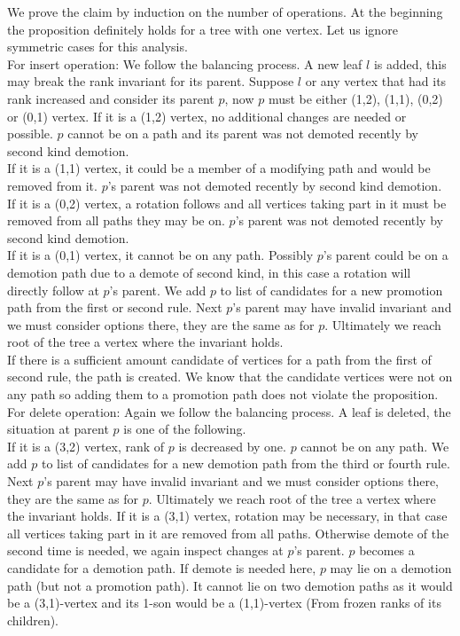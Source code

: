 \begin{myproof}
We prove the claim by induction on the number of operations. At the beginning the proposition definitely holds for a tree with one vertex. 
Let us ignore symmetric cases for this analysis.\\
For insert operation: We follow the balancing process. A new leaf $l$ is added, this may break the rank invariant for its parent. Suppose $l$ or any vertex that had its rank increased and consider its parent $p$, now $p$ must be either (1,2), (1,1), (0,2) or (0,1) vertex. 
If it is a (1,2) vertex, no additional changes are needed or possible. $p$ cannot be on a path and its parent was not demoted recently by second kind demotion.\\
If it is a (1,1) vertex, it could be a member of a modifying path and would be removed from it. $p$'s parent was not demoted recently by second kind demotion.\\
If it is a (0,2) vertex, a rotation follows and all vertices taking part in it must be removed from all paths they may be on. $p$'s parent was not demoted recently by second kind demotion.\\
If it is a (0,1) vertex, it cannot be on any path. Possibly $p$'s parent could be on a demotion path due to a demote of second kind, in this case a rotation will directly follow at $p$'s parent. We add $p$ to list of candidates for a new promotion path from the first or second rule. Next $p$'s parent may have invalid invariant and we must consider options there, they are the same as for $p$. Ultimately we reach root of the tree a vertex where the invariant holds.\\
If there is a sufficient amount candidate of vertices for a path from the first of second rule, the path is created. We know that the candidate vertices were not on any path so adding them to a promotion path does not violate the proposition.\\
For delete operation: Again we follow the balancing process. A leaf is deleted, the situation at parent $p$ is one of the following.\\
If it is a (3,2) vertex, rank of $p$ is decreased by one. $p$ cannot be on any path. We add $p$ to list of candidates for a new demotion path from the third or fourth rule. Next $p$'s parent may have invalid invariant and we must consider options there, they are the same as for $p$. Ultimately we reach root of the tree a vertex where the invariant holds.
If it is a (3,1) vertex, rotation may be necessary, in that case all vertices taking part in it are removed from all paths. Otherwise demote of the second time is needed, we again inspect changes at $p$'s parent. $p$ becomes a candidate for a demotion path. If demote is needed here, $p$ may lie on a demotion path (but not a promotion path). It cannot lie on two demotion paths as it would be a (3,1)-vertex and its 1-son would be a (1,1)-vertex (From frozen ranks of its children).

\end{myproof}

